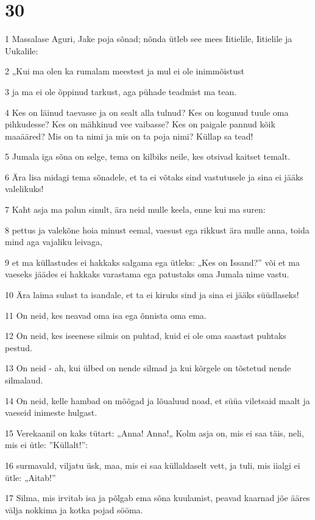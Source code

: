 \chapter{30}

\par 1 Massalase Aguri, Jake poja sõnad; nõnda ütleb see mees Iitielile, Iitielile ja Uukalile:
\par 2 „Kui ma olen ka rumalam meestest ja mul ei ole inimmõistust
\par 3 ja ma ei ole õppinud tarkust, aga pühade teadmist ma tean.
\par 4 Kes on läinud taevasse ja on sealt alla tulnud? Kes on kogunud tuule oma pihkudesse? Kes on mähkinud vee vaibasse? Kes on paigale pannud kõik maaääred? Mis on ta nimi ja mis on ta poja nimi? Küllap sa tead!
\par 5 Jumala iga sõna on selge, tema on kilbiks neile, kes otsivad kaitset temalt.
\par 6 Ära lisa midagi tema sõnadele, et ta ei võtaks sind vastutusele ja sina ei jääks valelikuks!
\par 7 Kaht asja ma palun sinult, ära neid mulle keela, enne kui ma suren:
\par 8 pettus ja valekõne hoia minust eemal, vaesust ega rikkust ära mulle anna, toida mind aga vajaliku leivaga,
\par 9 et ma küllastudes ei hakkaks salgama ega ütleks: „Kes on Issand?” või et ma vaeseks jäädes ei hakkaks varastama ega patustaks oma Jumala nime vastu.
\par 10 Ära laima sulast ta isandale, et ta ei kiruks sind ja sina ei jääks süüdlaseks!
\par 11 On neid, kes neavad oma isa ega õnnista oma ema.
\par 12 On neid, kes iseenese silmis on puhtad, kuid ei ole oma saastast puhtaks pestud.
\par 13 On neid - ah, kui ülbed on nende silmad ja kui kõrgele on tõstetud nende silmalaud.
\par 14 On neid, kelle hambad on mõõgad ja lõualuud noad, et süüa viletsaid maalt ja vaeseid inimeste hulgast.
\par 15 Verekaanil on kaks tütart: „Anna! Anna!„ Kolm asja on, mis ei saa täis, neli, mis ei ütle: ”Küllalt!”:
\par 16 surmavald, viljatu üsk, maa, mis ei saa küllaldaselt vett, ja tuli, mis iialgi ei ütle: „Aitab!”
\par 17 Silma, mis irvitab isa ja põlgab ema sõna kuulamist, peavad kaarnad jõe ääres välja nokkima ja kotka pojad sööma.
